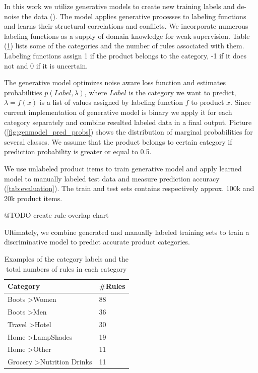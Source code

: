
In this work we utilize generative models to create new training labels and de-noise the data (\cite{genmodels}).
The model applies generative processes to labeling functions and learns their structural correlations and conflicts.
We incorporate numerous labeling functions as a supply of domain knowledge for weak supervision. Table (\ref{tab:numrules})
lists some of the categories and the number of rules associated with them. Labeling functions assign 1 if the product belongs
to the category, -1 if it does not and 0 if it is uncertain\cite{genmodels}.

The generative model optimizes noise aware loss function and estimates probabilities $p(Label, \lambda)$,
where $Label$ is the category we want to predict, $\lambda = f(x)$ is a list of values assigned by labeling
function $f$ to product $x$.  Since current implementation of generative model is binary we apply it for each
category separately and combine resulted labeled data in a final output. Picture (\ref{fig:genmodel_pred_probs}) shows
the distribution of marginal probabilities for several classes. We assume that the product belongs to certain category if
prediction probability is greater or equal to 0.5.

We use unlabeled product items to train generative model and apply learned model to manually labeled test data and measure
prediction accuracy (\ref{tab:evaluation}).
The train and test sets contains respectively approx. 100k and 20k product items.

@TODO create rule overlap chart

Ultimately, we combine generated and manually labeled training sets to train a discriminative model to predict accurate product categories.

\begin{table}
  \caption{Examples of the category labels and the total numbers of rules in each category}
  \label{tab:numrules}
  \begin{tabular}{ll}
    \toprule
    Category & \#Rules\\
    \midrule
    Boots \textgreater Women &	88	\\
    Boots \textgreater Men	& 36 \\
 	Travel \textgreater Hotel & 30 \\
 	Home \textgreater LampShades & 19 \\
 	Home \textgreater Other & 11 \\
 	Grocery \textgreater Nutrition Drinks & 11 \\
    \bottomrule
  \end{tabular}
\end{table}

